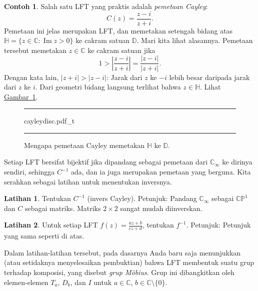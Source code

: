 \documentclass[12pt,openany]{book}
\renewcommand{\Im}{\operatorname{Im}}
\newcommand{\sabs}[1]{\lvert {#1} \rvert}
\newcommand{\abs}[1]{\left\lvert {#1} \right\rvert}
\newcommand{\C}{{\mathbb{C}}}
\newcommand{\D}{{\mathbb{D}}}
\newcommand{\bH}{{\mathbb{H}}}
\newcommand{\bP}{{\mathbb{P}}}
\newcommand{\myindex}[1]{#1\index{#1}}
\theoremstyle{plain}
\theoremstyle{remark}
\theoremstyle{definition}
\newenvironment{exbox}{%
    \def\FrameCommand{\vrule width 1pt \relax\hspace{10pt}}%
    \MakeFramed{\advance\hsize-\width\FrameRestore}%
}{%
    \endMakeFramed
}
\newenvironment{myfig}{%
\begin{figure}[h!t]
\noindent\rule{\textwidth}{0.5pt}\vspace{12pt}\par\centering}%
{\par\noindent\rule{\textwidth}{0.5pt}
\end{figure}}
\theoremstyle{exercise}
\newtheorem{exercise}{Latihan}[section]
\theoremstyle{example}
\newtheorem{example}[thm]{Contoh}
\newcommand{\figureref}[1]{\hyperref[#1]{Gambar~\ref*{#1}}}
\begin{document}
\begin{example}
Salah satu LFT yang praktis adalah
\emph{\myindex{pemetaan Cayley}}:
\begin{equation*}
C(z)
=
\frac{z - i}{z + i} .
\end{equation*}
Pemetaan ini jelas merupakan LFT\@, dan
memetakan setengah bidang atas $\bH = \{ z \in \C : \Im z > 0 \}$ ke
cakram satuan $\D$.  Mari kita lihat alasannya.  Pemetaan tersebut memetakan $z \in \C$ ke cakram satuan jika
\begin{equation*}
1 > \abs{\frac{z - i}{z + i} }
=
\frac{\sabs{z - i}}{\sabs{z + i}} .
\end{equation*}
Dengan kata lain, $\sabs{z+i} > \sabs{z - i}$: Jarak dari $z$
ke $-i$ lebih besar daripada jarak dari $z$ ke $i$.  Dari geometri bidang
langsung terlihat bahwa $z \in \bH$.  Lihat
\figureref{fig:cayleydisc}.
\begin{myfig}
{cayleydisc.pdf_t}
\caption{Mengapa pemetaan Cayley memetakan $\bH$ ke $\D$.\label{fig:cayleydisc}}
\end{myfig}
\end{example}

Setiap LFT bersifat bijektif jika dipandang sebagai pemetaan dari $\C_\infty$
ke dirinya sendiri, sehingga $C^{-1}$ ada, dan ia juga merupakan pemetaan yang berguna.  Kita serahkan
sebagai latihan untuk menentukan inversnya.

\begin{exbox}
\begin{exercise}
Tentukan $C^{-1}$ (invers Cayley).  Petunjuk: Pandang $\C_\infty$ sebagai $\C \bP^1$
dan $C$ sebagai matriks.  Matriks $2 \times 2$ sangat mudah diinverskan.
\end{exercise}

\begin{exercise}
Untuk setiap LFT $f(z) = \frac{az+b}{cz+d}$, tentukan $f^{-1}$.
Petunjuk: Petunjuk yang sama seperti di atas.
\end{exercise}
\end{exbox}

Dalam latihan-latihan tersebut, pada dasarnya Anda baru saja menunjukkan (atau setidaknya menyelesaikan
pembuktian) bahwa LFT membentuk suatu grup terhadap komposisi,
yang disebut \emph{\myindex{grup M\"obius}}.
Grup ini dibangkitkan oleh elemen-elemen
$T_a$, $D_b$, dan $I$ untuk $a\in \C$, $b \in \C \setminus \{ 0 \}$.

\end{document}
